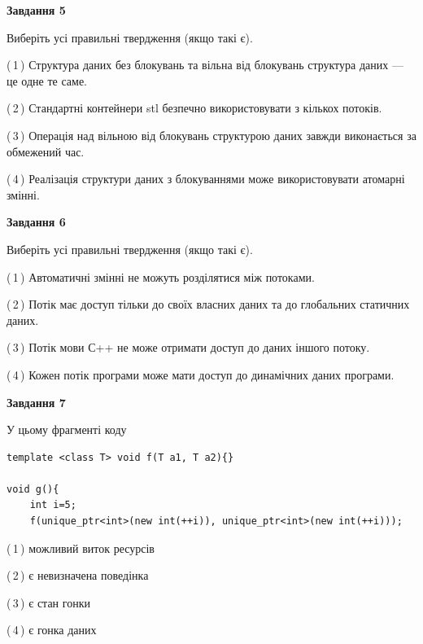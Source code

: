 \documentclass[12pt, ukrainian]{article}
\begin{document}
\begin {large}
{\begin{center}
\textbf{Завдання 5}
\end{center}

Виберіть усі правильні твердження (якщо такі є).\par
\vspace{2mm}

(\,1\,) Структура даних без блокувань та вільна від блокувань структура даних --- це одне те саме.%

(\,2\,) Стандартні контейнери stl безпечно використовувати з кількох потоків.%

(\,3\,) Операція над вільною від блокувань структурою даних завжди виконається за обмежений час.%

(\,4\,) Реалізація структури даних з блокуваннями може використовувати атомарні змінні.%
\newpage


\begin{center}
\textbf{Завдання 6}
\end{center}

Виберіть усі правильні твердження (якщо такі є).\par
\vspace{2mm}

(\,1\,) Автоматичні змінні не можуть розділятися між потоками.%

(\,2\,) Потік має доступ тільки до своїх власних даних та до глобальних статичних даних.%

(\,3\,) Потік мови С++ не може отримати доступ до даних іншого потоку.%

(\,4\,) Кожен потік програми може мати доступ до динамічних даних програми.%


\begin{center}
\textbf{Завдання 7}
\end{center}

У цьому фрагменті коду
\begin{verbatim}
template <class T> void f(T a1, T a2){}

void g(){
    int i=5;
    f(unique_ptr<int>(new int(++i)), unique_ptr<int>(new int(++i)));
\end{verbatim}

(\,1\,) можливий виток ресурсів%

(\,2\,) є невизначена поведінка%

(\,3\,) є стан гонки%

(\,4\,) є гонка даних%

}
\end {large}

\vspace{4mm}
\newpage
\end{document}
